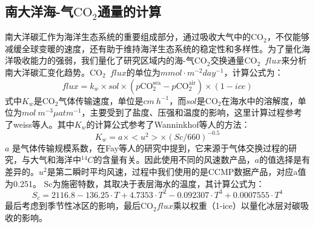 \subsection{南大洋海-气\texorpdfstring{$\mathrm{CO_2}$}{}通量的计算}
南大洋碳汇作为海洋生态系统的重要组成部分，通过吸收大气中的$\mathrm{CO_2}$，不仅能够减缓全球变暖的速度，还有助于维持海洋生态系统的稳定性和多样性。为了量化海洋吸收能力的强弱，我们量化了研究区域内的海-气$\mathrm{CO_2}$交换通量$\mathrm{CO_2}$\ $flux$来分析南大洋碳汇变化趋势。$\mathrm{CO_2}$\ $flux$的单位为$mmol \cdot m^{-2}day^{-1}$，计算公式为：
\begin{equation}
    \label{equ:flux-1}
    flux = k_w \times sol \times (p\mathrm{CO_2^{sea}}-p\mathrm{CO_2^{air}})\times (1-ice)
\end{equation}
式中$K_w$是$\mathrm{CO_2}$气体传输速度，单位是$cm \ h^{-1}$，而$sol$是$\mathrm{CO_2}$在海水中的溶解度，单位为$mol\ m^{-3} \mu atm^{-1}$，主要受到了盐度、压强和温度的影响，这里计算过程参考了weiss等人\cite{weiss1974carbon}。其中$K_w$的计算公式参考了Wanninkhof等人\cite{wanninkhof2014relationship}的方法：
\begin{equation}
    \label{equ:flux-2}
    K_w=a\times<u^2>\times\left(Sc/660\right)^{-0.5}
\end{equation}
$a$ 是气体传输规模系数，在Fay等人\cite{Harmonization_2021}的研究中提到，它来源于气体交换过程的研究，与大气和海洋中$^{14}C$的含量有关。因此使用不同的风速数产品，$a$的值选择是有差异的。$u^2$是第二瞬时平均风速，过程中我们使用的是CCMP数据产品，对应a值为0.251\cite{Harmonization_2021}。
Sc为施密特数，其取决于表层海水的温度，其计算公式为：
\begin{equation}
    \label{equ:flux-3}
    S_c=2116.8-136.25\cdot T +4.7353\cdot  T^2-0.092307 \cdot T^3+0.0007555\cdot T^4
\end{equation}
最后考虑到季节性冰区的影响，最后$\mathrm{CO_2} flux$乘以权重（1-ice）以量化冰层对碳吸收的影响。

